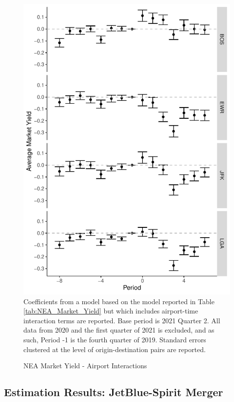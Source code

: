 \documentclass{article}
\let\Oldsubsection\subsection
\renewcommand{\subsection}{\FloatBarrier\Oldsubsection}
\begin{document}
\begin{appendices}
	\begin{figure}
		\caption{NEA Market Yield - Airport Interactions}
		\label{fig:NEA_Market_Yield_Interaction}
		\includegraphics[width = \linewidth]{NEA_Airport_Yield_Graph}
		\footnotesize{Coefficients from a model based on the model reported in Table \ref{tab:NEA_Market_Yield} but which includes airport-time interaction terms are reported. Base period is 2021 Quarter 2. All data from 2020 and the first quarter of 2021 is excluded, and as such, Period -1 is the fourth quarter of 2019. Standard errors clustered at the level of origin-destination pairs are reported. }
	\end{figure}	
	
	\subsection{Estimation Results: JetBlue-Spirit Merger}
	

\end{appendices}
\end{document}
